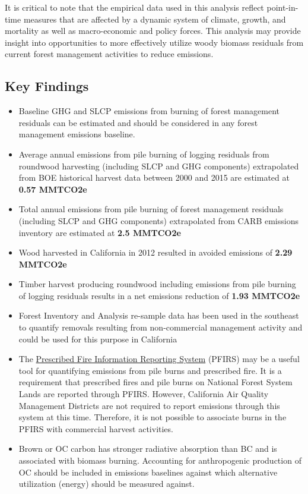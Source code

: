 \documentclass[a4paper,titlepage]{article}
\begin{document}
It is critical to note that the empirical data used in this analysis reflect point-in-time measures that are affected by a dynamic system of climate, growth, and mortality as well as macro-economic and policy forces. This analysis may provide insight into opportunities to more effectively utilize woody biomass residuals from current forest management activities to reduce emissions. 

\subsection{Key Findings}
\label{sec:orgheadline2}
\begin{itemize}
\item Baseline \ac{GHG} and \ac{SLCP} emissions from burning of forest
management residuals can be estimated and should be considered in
any forest management emissions baseline.

\item Average annual emissions from pile burning of logging residuals from roundwood harvesting
(including \ac{SLCP} and \ac{GHG} components) extrapolated from \ac{BOE} historical harvest data between 2000 and 2015 are estimated at \textbf{0.57 MMTCO2e}

\item Total annual emissions from pile burning of forest management residuals
(including \ac{SLCP} and \ac{GHG} components) extrapolated from CARB emissions
inventory are estimated at \textbf{2.5 MMTCO2e}

\item Wood harvested in California in 2012 resulted in avoided emissions of
\textbf{2.29 MMTCO2e}

\item Timber harvest producing roundwood including emissions from pile burning of logging residuals results in a net emissions reduction of \textbf{1.93 MMTCO2e}

\item Forest Inventory and Analysis re-sample data has been used in the
southeast to quantify removals resulting from non-commercial
management activity and could be used for this purpose in California

\item The \href{https://ssl.arb.ca.gov/pfirs/}{Prescribed Fire Information Reporting System} (PFIRS) may be a useful tool for quantifying
emissions from pile burns and prescribed fire. It is a requirement that prescribed fires and pile
burns on National Forest System Lands are reported through PFIRS. However, California Air Quality Management
Districts are not required to report emissions through this system at this time. Therefore, it is not possible to associate burns in the PFIRS with commercial harvest activities.

\item Brown or \ac{OC} carbon has stronger radiative absorption than \ac{BC} and is associated with biomass burning. Accounting for anthropogenic production of \ac{OC} should be included in emissions baselines against which alternative utilization (energy) should be measured against.
\end{itemize}
\end{document}
